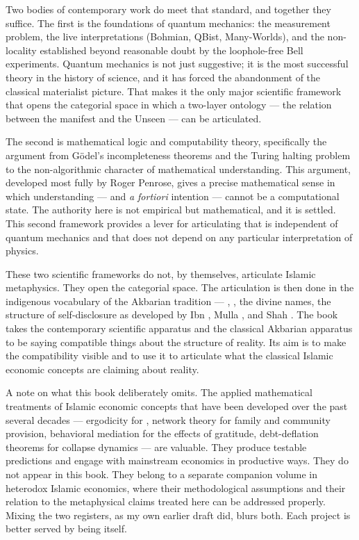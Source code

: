 Two bodies of contemporary work do meet that standard, and together they
suffice. The first is the foundations of quantum mechanics: the
measurement problem, the live interpretations (Bohmian, QBist,
Many-Worlds), and the non-locality established beyond reasonable doubt
by the loophole-free Bell experiments. Quantum mechanics is not just
suggestive; it is the most successful theory in the history of science,
and it has forced the abandonment of the classical materialist picture.
That makes it the only major scientific framework that opens the
categorial space in which a two-layer ontology --- the relation between
the manifest and the Unseen --- can be articulated.

The second is mathematical logic and computability theory, specifically
the argument from G\"odel's incompleteness theorems and the Turing
halting problem to the non-algorithmic character of mathematical
understanding. This argument, developed most fully by Roger Penrose,
gives a precise mathematical sense in which understanding --- and
\textit{a fortiori} intention --- cannot be a computational state. The
authority here is not empirical but mathematical, and it is settled.
This second framework provides a lever for articulating 
that is independent of quantum mechanics and that does not depend on any
particular interpretation of physics.

These two scientific frameworks do not, by themselves, articulate
Islamic metaphysics. They open the categorial space. The articulation
is then done in the indigenous vocabulary of the Akbarian tradition ---
, , the divine names, the structure of
self-disclosure as developed by Ibn , Mulla , and
Shah . The book takes the contemporary scientific
apparatus and the classical Akbarian apparatus to be saying compatible
things about the structure of reality. Its aim is to make the
compatibility visible and to use it to articulate what the classical
Islamic economic concepts are claiming about reality.

A note on what this book deliberately omits. The applied
mathematical treatments of Islamic economic concepts that have been
developed over the past several decades --- ergodicity for ,
network theory for family and community provision, behavioral mediation
for the effects of gratitude, debt-deflation theorems for collapse
dynamics --- are valuable. They produce testable predictions and engage
with mainstream economics in productive ways. They do not appear in
this book. They belong to a separate companion volume in heterodox
Islamic economics, where their methodological assumptions and their
relation to the metaphysical claims treated here can be addressed
properly. Mixing the two registers, as my own earlier draft did, blurs
both. Each project is better served by being itself.

